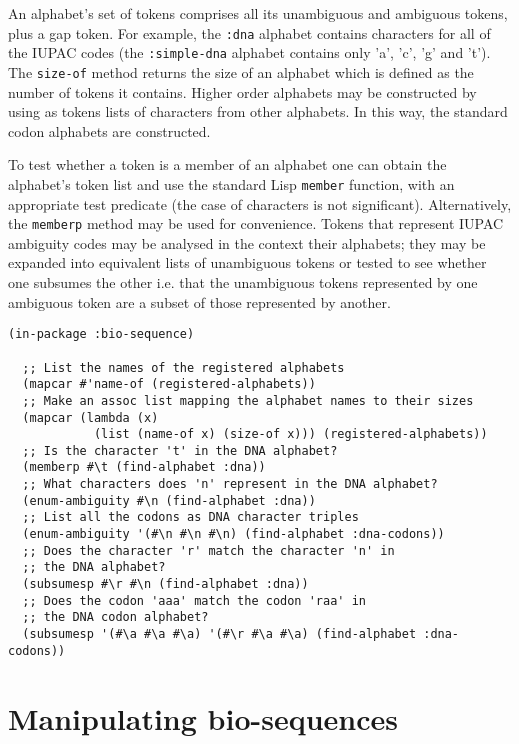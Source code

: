 \documentclass[a4paper, 12pt]{article}
\begin{document}
An alphabet's set of tokens comprises all its unambiguous and
ambiguous tokens, plus a gap token. For example, the \lstinline!:dna!
alphabet contains characters for all of the IUPAC codes (the
\lstinline!:simple-dna!  alphabet contains only 'a', 'c', 'g' and
't'). The \lstinline!size-of! method returns the size of an alphabet
which is defined as the number of tokens it contains. Higher order
alphabets may be constructed by using as tokens lists of characters
from other alphabets. In this way, the standard codon alphabets are
constructed.

To test whether a token is a member of an alphabet one can obtain the
alphabet's token list and use the standard Lisp \lstinline!member!
function, with an appropriate test predicate (the case of characters
is not significant). Alternatively, the \lstinline!memberp! method may
be used for convenience. Tokens that represent IUPAC ambiguity codes
may be analysed in the context their alphabets; they may be expanded
into equivalent lists of unambiguous tokens or tested to see whether
one subsumes the other i.e. that the unambiguous tokens represented by
one ambiguous token are a subset of those represented by another.

\begin{lstlisting}[caption={Using bio-sequence alphabets},
  label=use-bioseq-alphabets]
  (in-package :bio-sequence)
  
  ;; List the names of the registered alphabets
  (mapcar #'name-of (registered-alphabets))
  ;; Make an assoc list mapping the alphabet names to their sizes
  (mapcar (lambda (x)
            (list (name-of x) (size-of x))) (registered-alphabets))
  ;; Is the character 't' in the DNA alphabet?
  (memberp #\t (find-alphabet :dna))
  ;; What characters does 'n' represent in the DNA alphabet?
  (enum-ambiguity #\n (find-alphabet :dna))
  ;; List all the codons as DNA character triples
  (enum-ambiguity '(#\n #\n #\n) (find-alphabet :dna-codons))
  ;; Does the character 'r' match the character 'n' in
  ;; the DNA alphabet?
  (subsumesp #\r #\n (find-alphabet :dna))
  ;; Does the codon 'aaa' match the codon 'raa' in
  ;; the DNA codon alphabet?
  (subsumesp '(#\a #\a #\a) '(#\r #\a #\a) (find-alphabet :dna-codons))
\end{lstlisting}


\section{Manipulating bio-sequences}
\label{sec:manip-bioseq}
\end{document}
